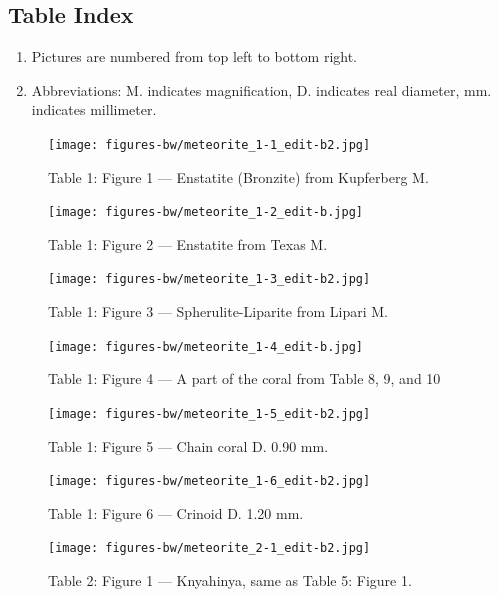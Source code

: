 \documentclass[a4paper, 12pt, oneside]{article}
\begin{document}
\subsection{Table Index}
\begin{enumerate}
    \item Pictures are numbered from top left to bottom right.
    \item Abbreviations: M. indicates magnification, D. indicates real diameter, mm. indicates millimeter.
\end{enumerate}
\clearpage
\pagestyle{fancy}
\fancyhf{}
\cfoot{\thepage}
\begin{figure}[b]
\texttt{[image: figures-bw/meteorite\_1-1\_edit-b2.jpg]}
\caption{Table 1: Figure 1 --- Enstatite (Bronzite) from Kupferberg M.}
\centering
\end{figure}
\clearpage
\begin{figure}[t]
\texttt{[image: figures-bw/meteorite\_1-2\_edit-b.jpg]}
\caption{Table 1: Figure 2 --- Enstatite from Texas M.}
\centering
\end{figure}
\clearpage
\begin{figure}[t]
\texttt{[image: figures-bw/meteorite\_1-3\_edit-b2.jpg]}
\caption{Table 1: Figure 3 --- Spherulite-Liparite from Lipari M.}
\centering
\end{figure}
\clearpage
\begin{figure}[t]
\texttt{[image: figures-bw/meteorite\_1-4\_edit-b.jpg]}
\caption{Table 1: Figure 4 --- A part of the coral from Table 8, 9, and 10}
\centering
\end{figure}
\clearpage
\begin{figure}[t]
\texttt{[image: figures-bw/meteorite\_1-5\_edit-b2.jpg]}
\caption{Table 1: Figure 5 --- Chain coral D. 0.90 mm.}
\centering
\end{figure}
\clearpage
\begin{figure}[t]
\texttt{[image: figures-bw/meteorite\_1-6\_edit-b2.jpg]}
\caption{Table 1: Figure 6 --- Crinoid D. 1.20 mm.}
\centering
\end{figure}
\clearpage
{}
\begin{figure}[t]
\texttt{[image: figures-bw/meteorite\_2-1\_edit-b2.jpg]}
\caption{Table 2: Figure 1 --- Knyahinya, same as Table 5: Figure 1.}
\centering
\end{figure}
\end{document}
